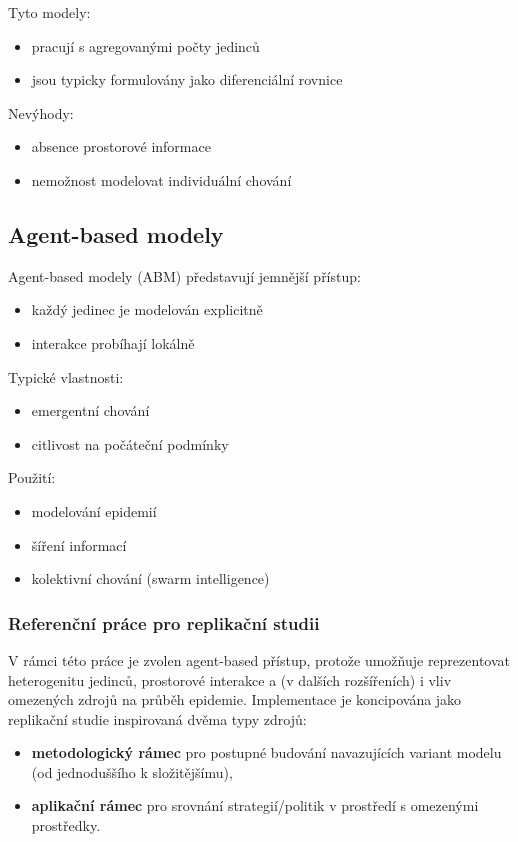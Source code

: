 \documentclass{article}
\begin{document}
Tyto modely:
\begin{itemize}
\item pracují s agregovanými počty jedinců
\item jsou typicky formulovány jako diferenciální rovnice
\end{itemize}

Nevýhody:
\begin{itemize}
\item absence prostorové informace
\item nemožnost modelovat individuální chování
\end{itemize}

\subsection{Agent-based modely}

Agent-based modely (ABM) představují jemnější přístup:

\begin{itemize}
\item každý jedinec je modelován explicitně
\item interakce probíhají lokálně
\end{itemize}

Typické vlastnosti:
\begin{itemize}
\item emergentní chování
\item citlivost na počáteční podmínky
\end{itemize}

Použití:
\begin{itemize}
\item modelování epidemií
\item šíření informací
\item kolektivní chování (swarm intelligence)
\end{itemize}

\subsubsection{Referenční práce pro replikační studii}

V rámci této práce je zvolen agent-based přístup, protože umožňuje reprezentovat heterogenitu jedinců, prostorové interakce a (v dalších rozšířeních) i vliv omezených zdrojů na průběh epidemie. Implementace je koncipována jako replikační studie inspirovaná dvěma typy zdrojů:
\begin{itemize}
\item \textbf{metodologický rámec} pro postupné budování navazujících variant modelu (od jednoduššího k složitějšímu),
\item \textbf{aplikační rámec} pro srovnání strategií/politik v prostředí s omezenými prostředky.
\end{itemize}
\end{document}
